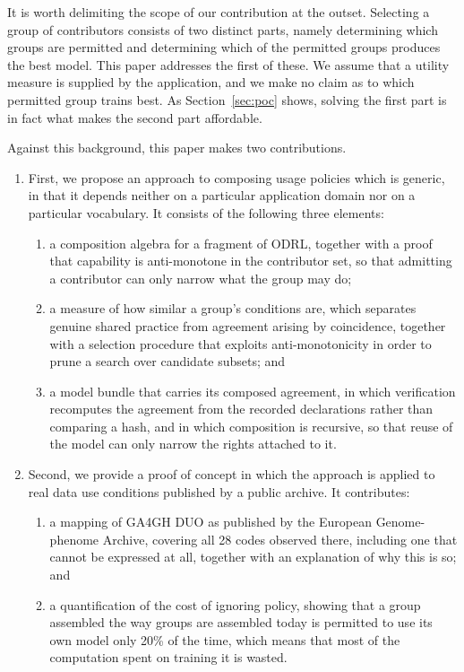 \documentclass[sigconf,anonymous,review]{acmart}
\begin{document}
It is worth delimiting the scope of our contribution at the outset. Selecting a
group of contributors consists of two distinct parts, namely determining which
groups are permitted and determining which of the permitted groups produces the
best model. This paper addresses the first of these. We assume that a utility
measure is supplied by the application, and we make no claim as to which
permitted group trains best. As Section~\ref{sec:poc} shows, solving the first
part is in fact what makes the second part affordable.

Against this background, this paper makes two contributions.

\begin{enumerate}
\item First, we propose an approach to composing usage policies which is
generic, in that it depends neither on a particular application domain nor on a
particular vocabulary. It consists of the following three elements:
  \begin{enumerate}
  \item a composition algebra for a fragment of ODRL, together with a proof that
  capability is anti-monotone in the contributor set, so that admitting a
  contributor can only narrow what the group may do;
  \item a measure of how similar a group's conditions are, which separates
  genuine shared practice from agreement arising by coincidence, together with a
  selection procedure that exploits anti-monotonicity in order to prune a search
  over candidate subsets; and
  \item a model bundle that carries its composed agreement, in which
  verification recomputes the agreement from the recorded declarations rather
  than comparing a hash, and in which composition is recursive, so that reuse of
  the model can only narrow the rights attached to it.
  \end{enumerate}
\item Second, we provide a proof of concept in which the approach is applied to
real data use conditions published by a public archive. It contributes:
  \begin{enumerate}
  \item a mapping of GA4GH DUO as published by the European Genome-phenome
  Archive, covering all 28 codes observed there, including one that cannot be
  expressed at all, together with an explanation of why this is so; and
  \item a quantification of the cost of ignoring policy, showing that a group
  assembled the way groups are assembled today is permitted to use its own model
  only 20\% of the time, which means that most of the computation spent on
  training it is wasted.
  \end{enumerate}
\end{enumerate}
\end{document}
